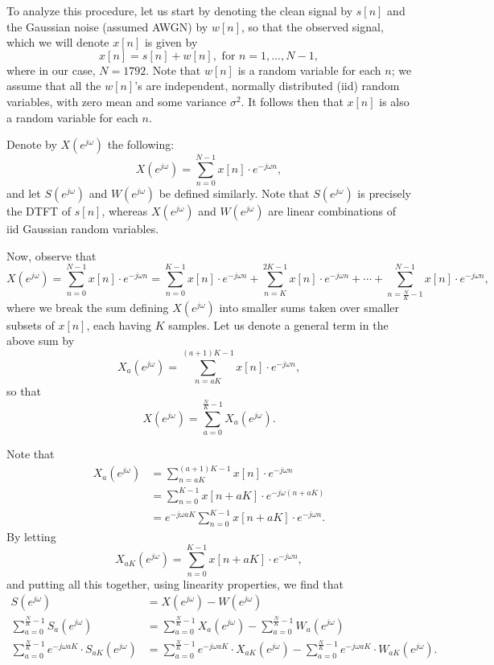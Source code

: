 \documentclass{article}[a4paper]
\begin{document}
	To analyze this procedure, let us start by denoting the clean signal by $s[n]$ and the Gaussian noise (assumed AWGN) by $w[n]$, so that the observed signal, which we will denote $x[n]$ is given by \[
		x[n] = s[n] + w[n], \text{ for } n = 1, \dots, N-1,
	\] where in our case, $N = 1792$. Note that $w[n]$ is a random variable for each $n$; we assume that all the $w[n]$'s are independent, normally distributed (iid) random variables, with zero mean and some variance $\sigma^2$. It follows then that $x[n]$ is also a random variable for each $n$.
	
	Denote by $X\left(e^{j\omega}\right)$ the following: \[
		X\left(e^{j\omega}\right)
		=
		\sum_{n=0}^{N-1} x[n] \cdot e^{-j\omega n},
	\] and let $S\left(e^{j\omega}\right)$ and $W\left(e^{j\omega}\right)$ be defined similarly. Note that $S\left(e^{j\omega}\right)$ is precisely the DTFT of $s[n]$, whereas $X\left(e^{j\omega}\right)$ and $W\left(e^{j\omega}\right)$ are linear combinations of iid Gaussian random variables.
	
	Now, observe that \[
		X\left(e^{j\omega}\right)
		=
		\sum_{n=0}^{N-1} x[n] \cdot e^{-j\omega n}
		=
		\sum_{n=0}^{K-1} x[n] \cdot e^{-j\omega n}
		+
		\sum_{n=K}^{2K-1} x[n] \cdot e^{-j\omega n}
		+
		\cdots
		+
		\sum_{n=\frac{N}{K} - 1}^{N-1} x[n] \cdot e^{-j\omega n},
	\] where we break the sum defining $X\left(e^{j\omega}\right)$ into smaller sums taken over smaller subsets of $x[n]$, each having $K$ samples. Let us denote a general term in the above sum by \[
		X_a\left(e^{j\omega}\right)
		=
		\sum_{n=aK}^{(a+1)K-1} x[n] \cdot e^{-j\omega n},
	\] so that \[
		X\left(e^{j\omega}\right)
		=
		\sum_{a=0}^{\frac{N}{K}-1} X_a\left(e^{j\omega}\right).
	\]
	
	Note that
	\begin{align*}
		X_a\left(e^{j\omega}\right)
		&=	\sum_{n=aK}^{(a+1)K-1} x[n] \cdot e^{-j\omega n} \\
		&=	\sum_{n=0}^{K-1} x[n + aK] \cdot e^{-j\omega (n + aK)} \\
		&=	e^{-j\omega aK} \sum_{n=0}^{K-1} x[n + aK] \cdot e^{-j\omega n}.
	\end{align*}
	By letting \[
		X_{aK} \left(e^{j\omega}\right) = \sum_{n=0}^{K-1} x[n + aK] \cdot e^{-j\omega n},
	\] and putting all this together, using linearity properties, we find that
	\begin{align*}
		S\left(e^{j\omega}\right)
		&=	X\left(e^{j\omega}\right) - W\left(e^{j\omega}\right) \\
		\sum_{a=0}^{\frac{N}{K}-1} S_a\left(e^{j\omega}\right)
		&=	\sum_{a=0}^{\frac{N}{K}-1} X_a\left(e^{j\omega}\right)
			-
			\sum_{a=0}^{\frac{N}{K}-1} W_a\left(e^{j\omega}\right) \\
		\sum_{a=0}^{\frac{N}{K}-1} e^{-j\omega aK} \cdot S_{aK} \left(e^{j\omega}\right)
		&=	\sum_{a=0}^{\frac{N}{K}-1} e^{-j\omega aK} \cdot X_{aK} \left(e^{j\omega}\right)
			-
			\sum_{a=0}^{\frac{N}{K}-1} e^{-j\omega aK} \cdot W_{aK} \left(e^{j\omega}\right).
	\end{align*}
	
\end{document}
